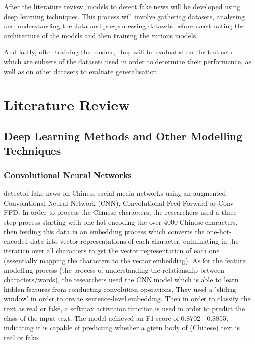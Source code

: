 \documentclass[stu,12pt,floatsintext,donotrepeattitle]{apa7}
\begin{document}
After the literature review, models to detect fake news will be developed using deep learning techniques. This process will involve gathering datasets, analysing and understanding the data and pre-processing datasets before constructing the architecture of the models and then training the various models.

And lastly, after training the models, they will be evaluated on the test sets which are subsets of the datasets used in order to determine their performance, as well as on other datasets to evaluate generalisation.

\clearpage
\section{Literature Review}
\subsection{Deep Learning Methods and Other Modelling Techniques}
\subsubsection{Convolutional Neural Networks}
\textcite{cnn_chinese} detected fake news on Chinese social media networks using an augmented Convolutional Neural Network (CNN), Convolutional Feed-Forward or Conv-FFD. In order to process the Chinese characters, the researchers used a three-step process starting with one-hot-encoding the over 4000 Chinese characters, then feeding this data in an embedding process which converts the one-hot-encoded data into vector representations of each character, culminating in the iteration over all characters to get the vector representation of each one (essentially mapping the characters to the vector embedding). As for the feature modelling process (the process of understanding the relationship between characters/words), the researchers used the CNN model which is able to learn hidden features from conducting convolution operations. They used a 'sliding window' in order to create sentence-level embedding. Then in order to classify the text as real or fake, a softmax activation function is used in order to predict the class of the input text. The model achieved an F1-score of 0.8702 - 0.8855, indicating it is capable of predicting whether a given body of (Chinese) text is real or fake. 
\end{document}
